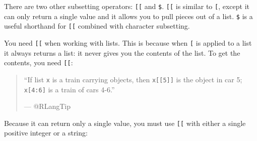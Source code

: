 
There are two other subsetting operators: \texttt{{[}{[}} and
\texttt{\$}. \texttt{{[}{[}} is similar to \texttt{{[}}, except it can
only return a single value and it allows you to pull pieces out of a
list. \texttt{\$} is a useful shorthand for \texttt{{[}{[}} combined
with character subsetting. \indexc{[[} \indexc{\$}

You need \texttt{{[}{[}} when working with lists. This is because when
\texttt{{[}} is applied to a list it always returns a list: it never
gives you the contents of the list. To get the contents, you need
\texttt{{[}{[}}:

\begin{quote}
``If list \texttt{x} is a train carrying objects, then
\texttt{x{[}{[}5{]}{]}} is the object in car 5; \texttt{x{[}4:6{]}} is a
train of cars 4-6.''

--- @RLangTip
\end{quote}

Because it can return only a single value, you must use \texttt{{[}{[}}
with either a single positive integer or a string:
 

\begin{Shaded}
\begin{Highlighting}[]
\StringTok{ }\NormalTok{(} \NormalTok{, } \NormalTok{)}
\NormalTok{a[[}\NormalTok{]]}
\NormalTok{a[[}\NormalTok{]]}

\StringTok{ }\NormalTok{(} \NormalTok{(} \NormalTok{(} \NormalTok{(} \NormalTok{))))}
\NormalTok{b[[}\NormalTok{(}\NormalTok{, }\NormalTok{, }\NormalTok{, }\NormalTok{)]]}
\NormalTok{b[[}\NormalTok{]][[}\NormalTok{]][[}\NormalTok{]][[}\NormalTok{]]}
\end{Highlighting}
\end{Shaded}

